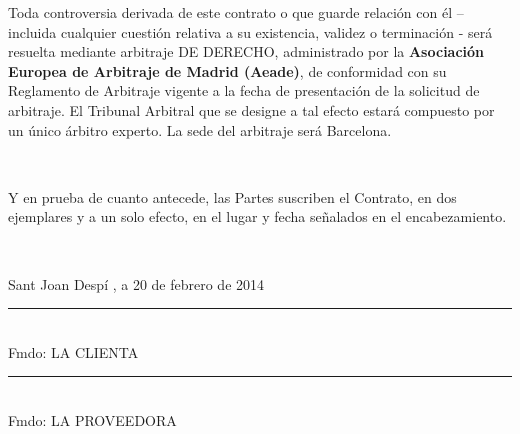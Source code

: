 \documentclass[11pt,spanish,a4paper,]{article}
\newcommand{\doubleSignature}[4]{%
  \parbox{\textwidth}{
    #3, a #4\\
    \vspace{3cm}

    \parbox{7cm}{
      \centering
      \rule{6cm}{1pt}\\
       Fmdo: #1 
    }
    \hfill
    \parbox{7cm}{
      \centering
      \rule{6cm}{1pt}\\
      Fmdo: #2
    }
  }
}
\begin{document}
Toda controversia derivada de este contrato o que guarde relación con él
-- incluida cualquier cuestión relativa a su existencia, validez o
terminación - será resuelta mediante arbitraje DE DERECHO, administrado
por la \textbf{Asociación Europea de Arbitraje de Madrid (Aeade)}, de
conformidad con su Reglamento de Arbitraje vigente a la fecha de
presentación de la solicitud de arbitraje. El Tribunal Arbitral que se
designe a tal efecto estará compuesto por un único árbitro experto. La
sede del arbitraje será Barcelona.

~

Y en prueba de cuanto antecede, las Partes suscriben el Contrato, en dos
ejemplares y a un solo efecto, en el lugar y fecha señalados en el
encabezamiento.

~

\doubleSignature{ LA CLIENTA }{ LA PROVEEDORA }{ Sant Joan Despí }{20 de febrero de 2014}
\end{document}
